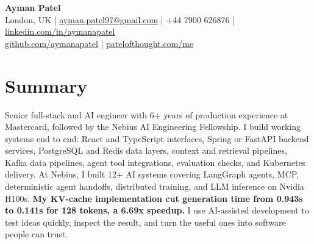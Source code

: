 \documentclass[a4paper,10pt]{article}
\begin{document}
\small

\begin{center}
  {\LARGE\textbf{Ayman Patel}}\\
  \vspace{2pt}
  London, UK \quad | \quad
  \href{mailto:ayman.patel97@gmail.com}{ayman.patel97@gmail.com} \quad | \quad
  +44 7900 626876 \quad | \quad
  \href{https://linkedin.com/in/aymanapatel}{linkedin.com/in/aymanapatel}\\
  \href{https://github.com/aymanapatel}{github.com/aymanapatel} \quad | \quad
  \href{https://patelofthought.com/me}{patelofthought.com/me}
\end{center}

\section{Summary}
Senior full-stack and AI engineer with 6+ years of production experience at Mastercard, followed by the Nebius AI Engineering Fellowship. I build working systems end to end: React and TypeScript interfaces, Spring or FastAPI backend services, PostgreSQL and Redis data layers, context and retrieval pipelines, Kafka data pipelines, agent tool integrations, evaluation checks, and Kubernetes delivery. At Nebius, I built 12+ AI systems covering LangGraph agents, MCP, deterministic agent handoffs, distributed training, and LLM inference on Nvidia H100s. \textbf{My KV-cache implementation cut generation time from 0.943s to 0.141s for 128 tokens, a 6.69x speedup.} I use AI-assisted development to test ideas quickly, inspect the result, and turn the useful ones into software people can trust.
\end{document}
